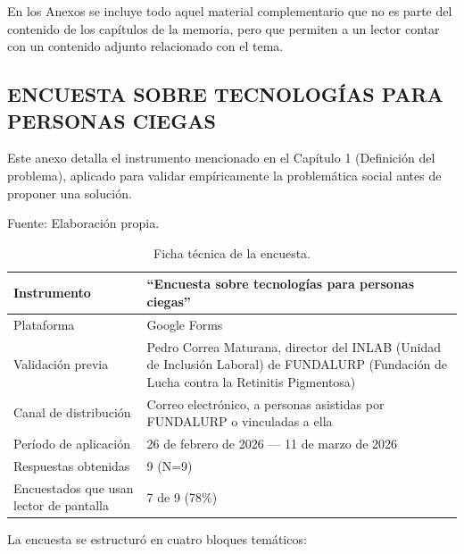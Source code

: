 
En los Anexos se incluye todo aquel material complementario que no es parte del contenido de los capítulos de la memoria, pero que permiten a un lector contar con un contenido adjunto relacionado con el tema.

\subsection{ENCUESTA SOBRE TECNOLOGÍAS PARA PERSONAS CIEGAS}
\label{anexo:encuesta}

Este anexo detalla el instrumento mencionado en el Capítulo 1 (Definición del problema), aplicado para validar empíricamente la problemática social antes de proponer una solución.

\begin{table}[h]
    \centering
    \caption{\label{table:fichaencuesta} Ficha técnica de la encuesta.} Fuente: Elaboración propia.
    \begin{tabular}{|p{5cm}|p{9cm}|}
        \hline
        Instrumento & ``Encuesta sobre tecnologías para personas ciegas'' \\
        \hline
        Plataforma & Google Forms \\
        \hline
        Validación previa & Pedro Correa Maturana, director del INLAB (Unidad de Inclusión Laboral) de FUNDALURP (Fundación de Lucha contra la Retinitis Pigmentosa) \\
        \hline
        Canal de distribución & Correo electrónico, a personas asistidas por FUNDALURP o vinculadas a ella \\
        \hline
        Período de aplicación & 26 de febrero de 2026 — 11 de marzo de 2026 \\
        \hline
        Respuestas obtenidas & 9 (N=9) \\
        \hline
        Encuestados que usan lector de pantalla & 7 de 9 (78\%) \\
        \hline
    \end{tabular}
\end{table}

La encuesta se estructuró en cuatro bloques temáticos:

